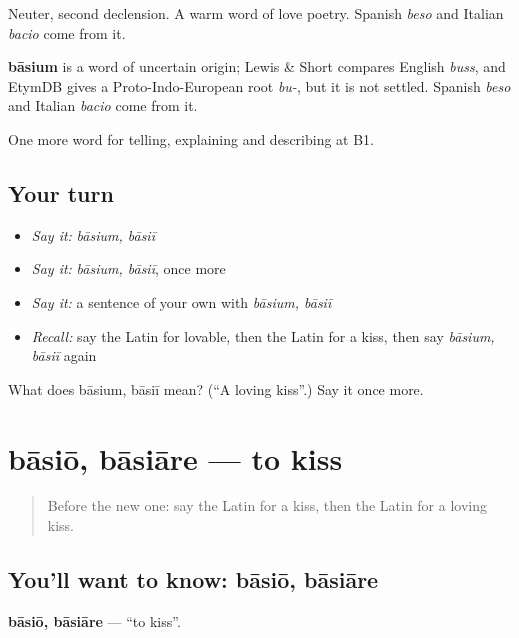 Neuter, second declension. A warm word of love poetry. Spanish \emph{beso} and Italian \emph{bacio} come from it.

\begin{cousinweb}
\textbf{bāsium} is a word of uncertain origin; Lewis \& Short compares English \emph{buss}, and EtymDB gives a Proto-Indo-European root \emph{bu-}, but it is not settled. Spanish \emph{beso} and Italian \emph{bacio} come from it.
\end{cousinweb}

\begin{grammarlens}[title={What you've built}]
One more word for telling, explaining and describing at B1.
\end{grammarlens}

\subsection*{Your turn}
\begin{itemize}
\raggedright
  \item \emph{Say it:} \emph{bāsium, bāsiī}
  \item \emph{Say it:} \emph{bāsium, bāsiī}, once more
  \item \emph{Say it:} a sentence of your own with \emph{bāsium, bāsiī}
  \item \emph{Recall:} say the Latin for lovable, then the Latin for a kiss, then say \emph{bāsium, bāsiī} again
\end{itemize}

\begin{tcolorbox}[breakable,colback=teal!4,colframe=teal!35!black,title={Before you move on}]
What does bāsium, bāsiī mean? (\textquotedblleft{}A loving kiss\textquotedblright{}.) Say it once more.
\end{tcolorbox}
\section[bāsiō, bāsiāre]{bāsiō, bāsiāre — to kiss}

\label{lesson:LA-C534-basio}



\begin{quote}
Before the new one: say the Latin for a kiss, then the Latin for a loving kiss.
\end{quote}

\subsection*{You'll want to know: bāsiō, bāsiāre}
\textbf{bāsiō, bāsiāre} — \textquotedblleft{}to kiss\textquotedblright{}.

